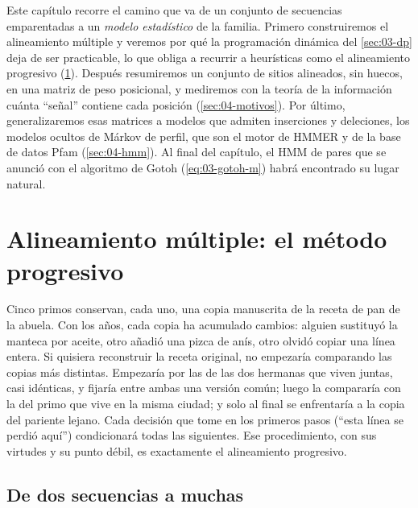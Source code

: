Este capítulo recorre el camino que va de un conjunto de secuencias emparentadas a un \emph{modelo estadístico} de la familia. Primero construiremos el alineamiento múltiple y veremos por qué la programación dinámica del \cref{sec:03-dp} deja de ser practicable, lo que obliga a recurrir a heurísticas como el alineamiento progresivo (\cref{sec:04-msa}). Después resumiremos un conjunto de sitios alineados, sin huecos, en una matriz de peso posicional, y mediremos con la teoría de la información cuánta ``señal'' contiene cada posición (\cref{sec:04-motivos}). Por último, generalizaremos esas matrices a modelos que admiten inserciones y deleciones, los modelos ocultos de Márkov de perfil, que son el motor de HMMER y de la base de datos Pfam (\cref{sec:04-hmm}). Al final del capítulo, el HMM de pares que se anunció con el algoritmo de Gotoh (\cref{eq:03-gotoh-m}) habrá encontrado su lugar natural.

\section{Alineamiento múltiple: el método progresivo}\label{sec:04-msa}

\begin{intuicion}
Cinco primos conservan, cada uno, una copia manuscrita de la receta de pan de la abuela. Con los años, cada copia ha acumulado cambios: alguien sustituyó la manteca por aceite, otro añadió una pizca de anís, otro olvidó copiar una línea entera. Si quisiera reconstruir la receta original, no empezaría comparando las copias más distintas. Empezaría por las de las dos hermanas que viven juntas, casi idénticas, y fijaría entre ambas una versión común; luego la compararía con la del primo que vive en la misma ciudad; y solo al final se enfrentaría a la copia del pariente lejano. Cada decisión que tome en los primeros pasos (``esta línea se perdió aquí'') condicionará todas las siguientes. Ese procedimiento, con sus virtudes y su punto débil, es exactamente el alineamiento progresivo.
\end{intuicion}

\subsection{De dos secuencias a muchas}

